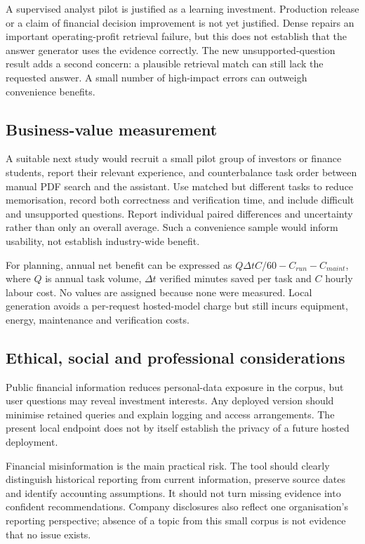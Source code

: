 \documentclass[11pt,a4paper]{article}
\begin{document}
A supervised analyst pilot is justified as a learning investment. Production release or a claim of financial decision improvement is not yet justified. Dense repairs an important operating-profit retrieval failure, but this does not establish that the answer generator uses the evidence correctly. The new unsupported-question result adds a second concern: a plausible retrieval match can still lack the requested answer. A small number of high-impact errors can outweigh convenience benefits.

\subsection{Business-value measurement}
A suitable next study would recruit a small pilot group of investors or finance students, report their relevant experience, and counterbalance task order between manual PDF search and the assistant. Use matched but different tasks to reduce memorisation, record both correctness and verification time, and include difficult and unsupported questions. Report individual paired differences and uncertainty rather than only an overall average. Such a convenience sample would inform usability, not establish industry-wide benefit.

For planning, annual net benefit can be expressed as $Q\Delta t C/60-C_{run}-C_{maint}$, where $Q$ is annual task volume, $\Delta t$ verified minutes saved per task and $C$ hourly labour cost. No values are assigned because none were measured. Local generation avoids a per-request hosted-model charge but still incurs equipment, energy, maintenance and verification costs.

\subsection{Ethical, social and professional considerations}
Public financial information reduces personal-data exposure in the corpus, but user questions may reveal investment interests. Any deployed version should minimise retained queries and explain logging and access arrangements. The present local endpoint does not by itself establish the privacy of a future hosted deployment.

Financial misinformation is the main practical risk. The tool should clearly distinguish historical reporting from current information, preserve source dates and identify accounting assumptions. It should not turn missing evidence into confident recommendations. Company disclosures also reflect one organisation's reporting perspective; absence of a topic from this small corpus is not evidence that no issue exists.
\end{document}
